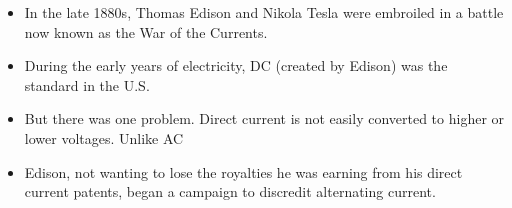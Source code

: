 \documentclass[preview]{standalone}
\begin{document}
\centering \begin{itemize} \item In the late 1880s, Thomas Edison and Nikola Tesla were embroiled in a battle now known as the War of the Currents. \item During the early years of electricity, DC (created by Edison) was the standard in the U.S. \item But there was one problem. Direct current is not easily converted to higher or lower voltages. Unlike AC \item Edison, not wanting to lose the royalties he was earning from his direct current patents, began a campaign to discredit alternating current. \end{itemize}
\end{document}
